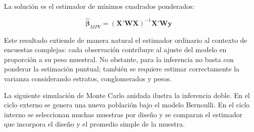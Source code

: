 \documentclass[
  spanish,
  12pt,
]{book}
\begin{document}
La solución es el estimador de mínimos cuadrados ponderados:

\[
\hat{\boldsymbol{\beta}}_{MPV}
= (\mathbf{X}'\mathbf{W}\mathbf{X})^{-1}\mathbf{X}'\mathbf{W}\mathbf{y}
\]

Este resultado extiende de manera natural el estimador ordinario al contexto de encuestas complejas: cada observación contribuye al ajuste del modelo en proporción a su peso muestral. No obstante, para la inferencia no basta con ponderar la estimación puntual; también se requiere estimar correctamente la varianza considerando estratos, conglomerados y pesos.

La siguiente simulación de Monte Carlo anidada ilustra la inferencia doble. En el ciclo externo se genera una nueva población bajo el modelo Bernoulli. En el ciclo interno se seleccionan muchas muestras por diseño y se comparan el estimador que incorpora el diseño y el promedio simple de la muestra.
\end{document}

